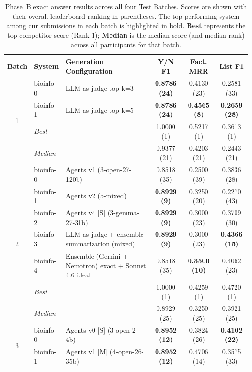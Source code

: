 \begin{table}[ht]
  \centering
  \caption{Phase~B exact answer results across all four Test Batches. Scores are shown with their overall leaderboard ranking in parentheses. The top-performing system among our submissions in each batch is highlighted in bold. \textbf{Best} represents the top competitor score (Rank 1); \textbf{Median} is the median score (and median rank) across all participants for that batch.}
  \label{tab:phaseb-exact-all}
  \footnotesize
  \begin{tabular}{cl|p{5.5cm}|ccc}
    \toprule
    \textbf{Batch} & \textbf{System} & \textbf{Generation Configuration} & \textbf{Y/N F1} & \textbf{Fact. MRR} & \textbf{List F1} \\
    \midrule
    \multirow{4}{*}{1}
    & bioinfo-0 & LLM-as-judge top-k=3 & \textbf{0.8786 (24)} & 0.4130 (23) & 0.2581 (33) \\
    & bioinfo-1 & LLM-as-judge top-k=5 & \textbf{0.8786 (24)} & \textbf{0.4565 (8)} & \textbf{0.2659 (28)} \\
    \cmidrule(l){2-6}
    & \textit{Best} & \multicolumn{1}{l|}{} & 1.0000 (1) & 0.5217 (1) & 0.3613 (1) \\
    & \textit{Median}& \multicolumn{1}{l|}{} & 0.9377 (21) & 0.4203 (21) & 0.2443 (21) \\
    \midrule
    \multirow{7}{*}{2}
    & bioinfo-0 & Agents v1 (3-open-27-120b) & 0.8518 (35) & 0.2500 (39) & 0.3836 (28) \\
    & bioinfo-1 & Agents v2 (5-mixed) & \textbf{0.8929 (9)} & 0.3250 (20) & 0.2270 (43) \\
    & bioinfo-2 & Agents v4 [S] (3-gemma-27-31b) & \textbf{0.8929 (9)} & 0.3000 (23) & 0.3709 (30) \\
    & bioinfo-3 & LLM-as-judge + ensemble summarization (mixed) & \textbf{0.8929 (9)} & 0.3000 (23) & \textbf{0.4366 (15)} \\
    & bioinfo-4 & Ensemble (Gemini + Nemotron) exact + Sonnet 4.6 ideal & 0.8518 (35) & \textbf{0.3500 (10)} & 0.4062 (23) \\
    \cmidrule(l){2-6}
    & \textit{Best} & \multicolumn{1}{l|}{} & 1.0000 (1) & 0.4259 (1) & 0.4720 (1) \\
    & \textit{Median}& \multicolumn{1}{l|}{} & 0.8929 (25) & 0.3250 (25) & 0.3921 (25) \\
    \midrule
    \multirow{7}{*}{3}
    & bioinfo-0 & Agents v0 [S] (3-open-2-4b) & \textbf{0.8952 (12)} & 0.3824 (26) & \textbf{0.4102 (22)} \\
    & bioinfo-1 & Agents v1 [M] (4-open-26-35b) & \textbf{0.8952 (12)} & 0.4706 (14) & 0.3575 (33) \\

\end{tabular}
\end{table}
